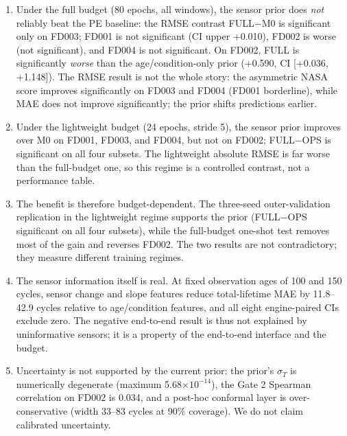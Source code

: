 \documentclass[journal]{IEEEtran}
\begin{document}
\begin{enumerate}
\item Under the full budget (80 epochs, all windows), the sensor prior does \emph{not} reliably beat the PE baseline: the RMSE contrast FULL$-$M0 is significant only on FD003; FD001 is not significant (CI upper +0.010), FD002 is worse (not significant), and FD004 is not significant. On FD002, FULL is significantly \emph{worse} than the age/condition-only prior (+0.590, CI [+0.036, +1.148]). The RMSE result is not the whole story: the asymmetric NASA score improves significantly on FD003 and FD004 (FD001 borderline), while MAE does not improve significantly; the prior shifts predictions earlier.
\item Under the lightweight budget (24 epochs, stride 5), the sensor prior improves over M0 on FD001, FD003, and FD004, but not on FD002; FULL$-$OPS is significant on all four subsets. The lightweight absolute RMSE is far worse than the full-budget one, so this regime is a controlled contrast, not a performance table.
\item The benefit is therefore budget-dependent. The three-seed outer-validation replication in the lightweight regime supports the prior (FULL$-$OPS significant on all four subsets), while the full-budget one-shot test removes most of the gain and reverses FD002. The two results are not contradictory; they measure different training regimes.
\item The sensor information itself is real. At fixed observation ages of 100 and 150 cycles, sensor change and slope features reduce total-lifetime MAE by 11.8--42.9 cycles relative to age/condition features, and all eight engine-paired CIs exclude zero. The negative end-to-end result is thus not explained by uninformative sensors; it is a property of the end-to-end interface and the budget.
\item Uncertainty is not supported by the current prior: the prior's $\sigma_T$ is numerically degenerate (maximum 5.68$\times10^{-14}$), the Gate 2 Spearman correlation on FD002 is 0.034, and a post-hoc conformal layer is over-conservative (width 33--83 cycles at 90\% coverage). We do not claim calibrated uncertainty.
\end{enumerate}
\end{document}
